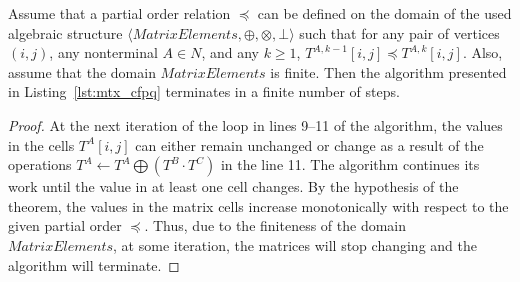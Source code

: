 \begin{theorem}\label{thm:finite_mtx}
	 Assume that a partial order relation $\preceq$ can be defined on the domain of the used algebraic structure $\langle \textit{MatrixElements}, \oplus, \otimes, \bot \rangle$ such that for any pair of vertices $(i, j)$, any nonterminal $A \in N$, and any $k \geq 1$, $T^{A, k - 1}[i, j] \preceq T^{A, k}[i, j]$. Also, assume that the domain $\textit{MatrixElements}$ is finite. Then the algorithm presented in Listing~\ref{lst:mtx_cfpq} terminates in a finite number of steps.
\end{theorem}
\begin{proof}
At the next iteration of the loop in lines 9--11 of the algorithm, the values in the cells $T^A[i, j]$ can either remain unchanged or change as a result of the operations $T^{A} \gets T^{A} \bigoplus (T^{B} \cdot T^{C})$ in the line 11. The algorithm continues its work until the value in at least one cell changes. By the hypothesis of the theorem, the values in the matrix cells increase monotonically with respect to the given partial order $\preceq$. Thus, due to the finiteness of the domain $\textit{MatrixElements}$, at some iteration, the matrices will stop changing and the algorithm will terminate.
\end{proof}

